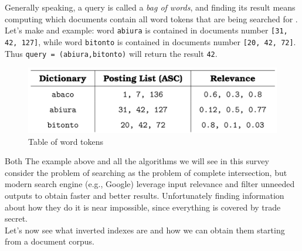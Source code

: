 Generally speaking, a query is called a \textit{bag of words}, and finding its result means computing which documents contain all word tokens that are being searched for . Let's make and example: word \verb+abiura+ is contained in documents number \verb+[31, 42, 127]+, while word \verb+bitonto+ is contained in documents number \verb+[20, 42, 72]+. \\
Thus \verb|query = (abiura,bitonto)| will return the result \verb+42+. \\

\begin{figure}[ht] 
\begin{center}
\includegraphics[width=.8\textwidth]{imgs/table_of_words.png}
\caption{Table of word tokens\label{fig:table_wtokens}}
\end{center}
\end{figure}

Both The example above  and all the algorithms we will see in this survey consider the problem of searching as the problem of complete intersection, but modern search engine (e.g., Google)  leverage input relevance and filter unneeded outputs to obtain faster and better results. Unfortunately finding information about how they do it is near impossible, since everything is covered by trade secret. \\
Let's now see what inverted indexes are and how we can obtain them starting from a document corpus.

